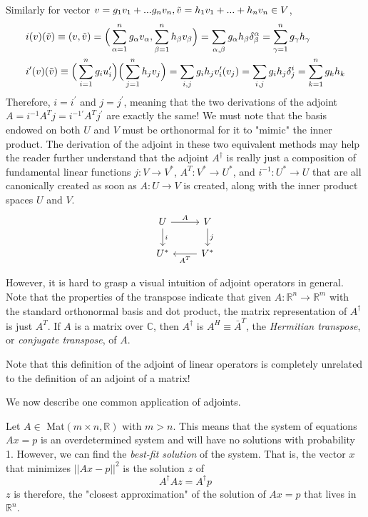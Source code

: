 \documentclass{article}
\begin{document}
    Similarly for vector $v = g_1 v_1 + ... g_n v_n, \Tilde{v} = h_1 v_1 + ... + h_n v_n \in V$, 
    \begin{align*}
        &i(v)(\Tilde{v}) \equiv (v, \Tilde{v}) = \Big(\sum_{\alpha = 1}^n g_\alpha v_\alpha, \sum_{\beta = 1}^n h_\beta v_\beta \Big) = \sum_{\alpha, \beta} g_\alpha h_\beta \delta^\alpha_\beta = \sum_{\gamma=1}^n g_\gamma h_\gamma \\
        &i^\prime(v)(\Tilde{v}) \equiv \Big(\sum_{i=1}^n g_i u_i^\prime \Big) \Big( \sum_{j=1}^n h_j v_j \Big) = \sum_{i, j} g_i h_j v_i^\prime (v_j) = \sum_{i, j} g_i h_j \delta^i_j = \sum_{k=1}^n g_k h_k
    \end{align*}
    Therefore, $i = i^\prime$ and $j = j^\prime$, meaning that the two derivations of the adjoint $A = i^{-1} A^T j = i^{-1 \prime} A^T j^\prime$ are exactly the same! We must note that the basis endowed on both $U$ and $V$ must be orthonormal for it to "mimic" the inner product. The derivation of the adjoint in these two equivalent methods may help the reader further understand that the adjoint $A^\dagger$ is really just a composition of fundamental linear functions $j: V \longrightarrow V^*$, $A^T: V^* \longrightarrow U^*$, and $i^{-1}: U^* \longrightarrow U$ that are all canonically created as soon as $A: U \longrightarrow V$ is created, along with the inner product spaces $U$ and $V$. 
    \[
      \begin{tikzcd}
        U \arrow{r}{A} \arrow{d}{i} & V \arrow{d}{j}\\
        U^* & V^* \arrow{l}{A^T}
      \end{tikzcd}
    \]

    However, it is hard to grasp a visual intuition of adjoint operators in general. Note that the properties of the transpose indicate that given $A: \mathbb{R}^n \longrightarrow \mathbb{R}^m$ with the standard orthonormal basis and dot product, the matrix representation of $A^\dagger$ is just $A^T$. If $A$ is a matrix over $\mathbb{C}$, then $A^\dagger$ is $A^H \equiv \bar{A}^T$, the \textit{Hermitian transpose}, or \textit{conjugate transpose}, of $A$. 

    Note that this definition of the adjoint of linear operators is completely unrelated to the definition of an adjoint of a matrix! 

    We now describe one common application of adjoints. 
    \begin{theorem}
    Let $A \in$ Mat$(m \times n, \mathbb{R})$ with $m > n$. This means that the system of equations $A x = p$ is an overdetermined system and will have no solutions with probability 1. However, we can find the \textit{best-fit solution} of the system. That is, the vector $x$ that minimizes $||A x -p||^2$ is the solution $z$ of 
    \[ A^\dagger A z = A^\dagger p\]
    $z$ is therefore, the "closest approximation" of the solution of $A x = p$ that lives in $\mathbb{R}^n$. 
    \end{theorem}
\end{document}
